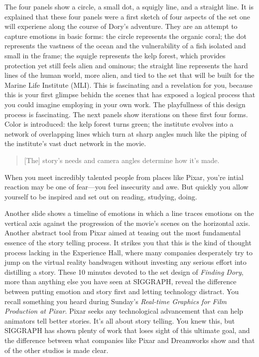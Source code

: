 \documentclass[../main.tex]{subfiles}
\begin{document}
The four panels show a circle, a small dot, a squigly line, and a straight line. It is explained that these four panels were a first sketch of four aspects of the set one will experiene along the course of Dory's adventure. They are an attempt to capture emotions in basic forms: the circle represents the organic coral; the dot represents the vastness of the ocean and the vulnerability of a fish isolated and small in the frame; the squigle represents the kelp forest, which provides protection yet still feels alien and ominous; the straight line represents the hard lines of the human world, more alien, and tied to the set that will be built for the Marine Life Institute (MLI). This is fascinating and a revelation for you, because this is your first glimpse behidn the scenes that has exposed a logical process that you could imagine employing in your own work. The playfullness of this design process is fascinating. The next panels show iterations on these first four forms. Color is introduced: the kelp forest turns green; the institute evolves into a network of overlapping lines which turn at sharp angles much like the piping of the institute's vast duct network in the movie.

\begin{quotation}
[The] story's needs and camera angles determine how it's made.
\end{quotation}

When you meet incredibly talented people from places like Pixar, you're intial reaction may be one of fear---you feel insecurity and awe. But quickly you allow yourself to be inspired and set out on reading, studying, doing.

Another slide shows a timeline of emotions in which a line traces emotions on the vertical axis against the progression of the movie's scenes on the horizontal axis. Another abstract tool from Pixar aimed at teasing out the most fundamental essence of the story telling process. It strikes you that this is the kind of thought process lacking in the Experience Hall, where many companies desperately try to jump on the virtual reality bandwagen without investing any serious effort into distilling a story. These 10 minutes devoted to the set design of \textit{Finding Dory}, more than anything else you have seen at SIGGRAPH, reveal the difference between putting emotion and story first and letting technology distract. You recall something you heard during Sunday's \textit{Real-time Graphics for Film Production at Pixar}. Pixar seeks any technological advancement that can help animators tell better stories. It's all about story telling. You knew this, but SIGGRAPH has shown plenty of work that loses sight of this ultimate goal, and the difference between what companies like Pixar and Dreamworks show and that of the other studios is made clear. 
\end{document}
